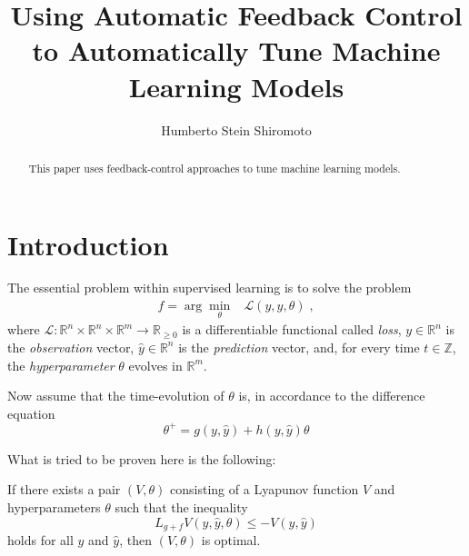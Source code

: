 \documentclass[a4paper]{tufte-handout}
\title{Using Automatic Feedback Control to Automatically Tune Machine Learning Models}
\author[H. Stein Shiromoto]{Humberto Stein Shiromoto}
\begin{document}
\maketitle%

\begin{abstract}
\noindent
This paper uses feedback-control approaches to tune machine learning models.
\end{abstract}


\section{Introduction}

The essential problem within supervised learning is to solve the problem
\begin{eqnarray}
  f=\arg\min_\theta&\mathcal{L}(y,\hat{y},\theta)\;,
\end{eqnarray}
where $\mathcal{L}:\mathbb{R}^n\times\mathbb{R}^n\times\mathbb{R}^m\to\mathbb{R}_{\geq0}$ is a differentiable functional called \emph{loss}, $y\in\mathbb{R}^n$ is the \emph{observation} vector, $\hat{y}\in\mathbb{R}^n$ is the \emph{prediction} vector, and, for every time $t\in\mathbb{Z}$, the \emph{hyperparameter} $\theta$ evolves in $\mathbb{R}^m$.

Now assume that the time-evolution of $\theta$ is, in accordance to the difference equation
\begin{equation}
\theta^+=g(y,\hat{y})+h(y,\hat{y})\theta
\end{equation}

What is tried to be proven here is the following:

If there exists a pair $(V,\theta)$ consisting of a Lyapunov function $V$ and hyperparameters $\theta$ such that the inequality
$$L_{g+f}V(y,\hat{y},\theta)\leq -V(y,\hat{y})$$
holds for all $y$ and $\hat{y}$, then $(V,\theta)$ is optimal. 
\end{document}
